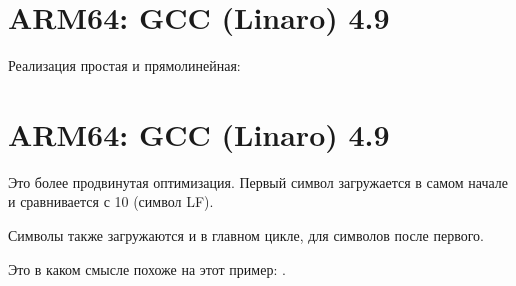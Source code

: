 ﻿\section{ARM64: \NonOptimizing GCC (Linaro) 4.9}

Реализация простая и прямолинейная:



\section{ARM64: \Optimizing GCC (Linaro) 4.9}

Это более продвинутая оптимизация.
Первый символ загружается в самом начале и сравнивается с 10 (символ \ac{LF}).

Символы также загружаются и в главном цикле, для символов после первого.

Это в каком смысле похоже на этот пример: .



